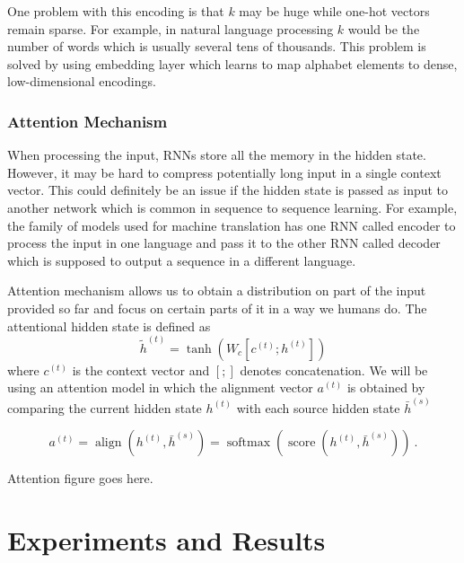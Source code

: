 \documentclass[titlepage]{report}
\DeclareMathOperator{\softmax}{softmax}
\DeclareMathOperator{\score}{score}
\DeclareMathOperator{\aln}{align}
\begin{document}
One problem with this encoding is that $k$ may be huge while one-hot vectors remain sparse. For example, in natural language processing $k$ would be the number of words which is usually several tens of thousands. This problem is solved by using embedding layer which learns to map alphabet elements to dense, low-dimensional encodings.

\subsection{Attention Mechanism}

When processing the input, RNNs store all the memory in the hidden state. However, it may be hard to compress potentially long input in a single context vector.
This could definitely be an issue if the hidden state is passed as input to another network which is common in sequence to sequence learning. For example, the family of models used for machine translation has one RNN called encoder to process the input in one language and pass it to the other RNN called decoder which is supposed to output a sequence in a different language.

Attention mechanism allows us to obtain a distribution on part of the input provided so far and focus on certain parts of it in a way we humans do. The attentional hidden state is defined as
\begin{equation*}
\widetilde{h}^{(t)} = \tanh(W_c [c^{(t)}; h^{(t)}])
\end{equation*}
where $c^{(t)}$ is the context vector and $[ ; ]$ denotes concatenation. We will be using an attention model in which the alignment vector $a^{(t)}$ is obtained by comparing the current hidden state $h^{(t)}$ with each source hidden state $\bar{h}^{(s)}$

\begin{equation*}
a^{(t)} = \aln (h^{(t)}, \bar{h}^{(s)}) = \softmax(\score(h^{(t)}, \bar{h}^{(s)})) \:.
\end{equation*}

\begin{center}
Attention figure goes here.
\end{center}

\chapter{Experiments and Results}

\normalem
\printbibliography
\end{document}
